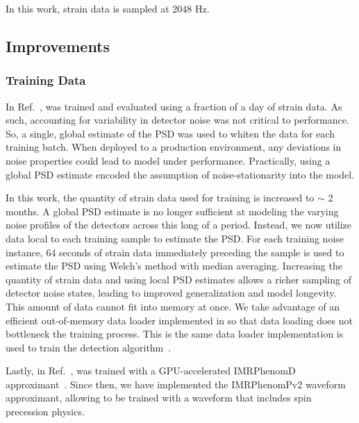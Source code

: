 \begin{refsection}
In this work, strain data is sampled at 2048 Hz.

\subsection{Improvements} \label{amp_res_sec:improvements}
\subsubsection{Training Data}
In Ref.~\cite{Chatterjee:2024pbj}, \amplfi was trained and evaluated using a fraction of a day of strain data. 
As such, accounting for variability in detector noise was not critical to performance. 
So, a single, global estimate of the PSD was used to whiten the data for each training batch. 
When deployed to a production environment, any deviations in noise properties could lead to model under performance. 
Practically, using a global PSD estimate encoded the assumption of noise-stationarity into the model. 

In this work, the quantity of strain data used for training is increased to $\sim$ 2 months. 
A global PSD estimate is no longer sufficient at modeling the varying noise profiles of the detectors across this long of a period. 
Instead, we now utilize data local to each training sample to estimate the PSD. 
For each training noise instance, 64 seconds of strain data immediately preceding the sample is used to estimate the PSD using Welch's method with median averaging. 
Increasing the quantity of strain data and using local PSD estimates allows a richer sampling of detector noise states, leading to improved generalization and model longevity. 
This amount of data cannot fit into memory at once. 
We take advantage of an efficient out-of-memory data loader implemented in \mlgw so that data loading does not bottleneck the training process. 
This is the same data loader implementation is used to train the \aframe detection algorithm~\cite{aframe-methods}.

Lastly, in Ref.~\cite{Chatterjee:2024pbj}, \amplfi was trained with a GPU-accelerated IMRPhenomD approximant~\cite{Khan:2015jqa}. 
Since then, we have implemented the IMRPhenomPv2 waveform approximant, allowing \amplfi to be trained with a waveform that includes spin precession physics.


\end{refsection}
